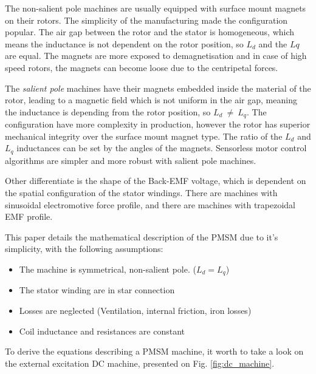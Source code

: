 \documentclass[twoside,b5paper,10pt]{article}
\begin{document}
The non-salient pole machines are usually equipped with surface mount magnets on their rotors. The simplicity of the manufacturing made the configuration popular. The air gap between the rotor and the stator is homogeneous, which means the inductance is not dependent on the rotor position, so  $L_d$ and the $Lq$ are equal. The magnets are more exposed to demagnetisation and in case of high speed rotors, the magnets can become loose due to the centripetal forces.



The \emph{salient pole} machines have their magnets embedded inside the material of the rotor, leading to a magnetic field which is not uniform in the air gap, meaning the inductance is depending from the rotor position, so $L_d\ \ne{}\ L_q$. The configuration have more complexity in production, however the rotor has superior mechanical integrity over the surface mount magnet type. The ratio of the $L_d$ and $L_q$ inductances can be set by the angles of the magnets. Sensorless motor control algorithms are simpler and more robust with salient pole machines.

Other differentiate is the shape of the Back-EMF voltage, which is dependent on the spatial configuration of the stator windings. There are machines with sinusoidal electromotive force profile, and there are machines with trapezoidal EMF profile. 



This paper details the mathematical description of the PMSM due to it's simplicity, with the following assumptions:
\begin{itemize}
  \item The machine is symmetrical, non-salient pole. ($L_d = L_q$)
  \item The stator winding are in star connection
  \item Losses are neglected (Ventilation, internal friction, iron losses)
  \item Coil inductance and resistances are constant
\end{itemize}

To derive the equations describing a PMSM machine, it worth to take a look on the external excitation DC machine, presented on Fig. \ref{fig:dc_machine}.


\end{document}
